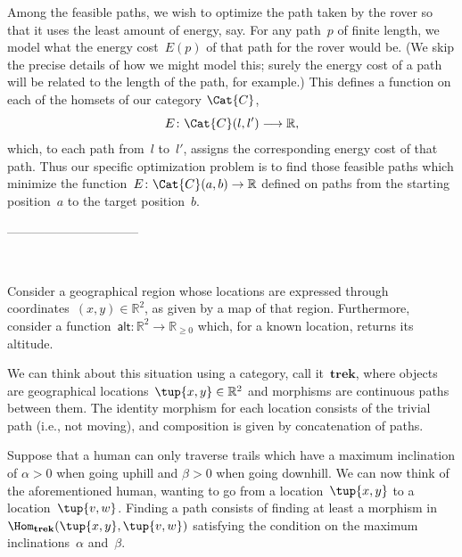 {Among the feasible paths, we wish to optimize the path taken by the rover so that it uses the least amount of energy, say.  For any path~$p$ of finite length, we model what the energy cost~$E(p)$ of that path for the rover would be. (We skip the precise details of how we might model this; surely the energy cost of a path will be related to the length of the path, for example.) This defines a function on each of the homsets of our category $\Cat{C}$, 
\begin{equation}
E \colon \Cat{C}(l, l') \longrightarrow \mathbb{R}, 
\end{equation}
which, to each path from~$l$ to~$l'$, assigns the corresponding energy cost of that path. Thus our specific optimization problem is to find those feasible paths which minimize the function~$E\colon \Cat{C}(a,b) \to \mathbb{R}$ defined on paths from the starting position~$a$ to the target position~$b$. 

--------------------------------



\


Consider a geographical region whose locations are expressed through coordinates~$(x,y)\in \mathbb{R}^2$,  as given by a map of that region. Furthermore, consider a function~$\mathsf{alt}: \mathbb{R}^2 \to \mathbb{R}_{\geq 0}$ which, for a known location, returns its altitude.

We can think about this situation using a category, call it~$\mathbf{trek}$, where objects are geographical locations~$\tup{x,y}\in \mathbb{R}^2$ and morphisms are continuous paths between them. The identity morphism for each location consists of the trivial path (i.e., not moving), and composition is given by concatenation of paths.

Suppose that a human can only traverse trails which have a maximum inclination of $\alpha>0$ when going uphill and $\beta>0$ when going downhill.
We can now think of the aforementioned human, wanting to go from a location~$\tup{x,y}$ to a location~$\tup{v,w}$. Finding a path consists of finding at least a morphism in~$\Hom_\mathbf{trek}(\tup{x,y},\tup{v,w})$ satisfying the condition on the maximum inclinations~$\alpha$ and~$\beta$.


}
